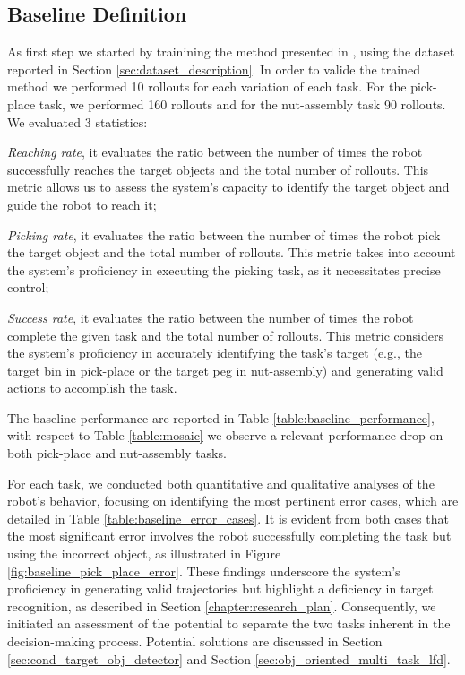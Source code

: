 \subsection{Baseline Definition}
\label{sec:baseline_definition}
As first step we started by trainining the method presented in \cite{mandi2022towards_more_generalizable_one_shot}, using the dataset reported in Section \ref{sec:dataset_description}. In order to valide the trained method we performed 10 rollouts for each variation of each task. For the pick-place task, we performed 160 rollouts and for the nut-assembly task 90 rollouts. We evaluated 3 statistics:
\begin{enumerate*}[label=(\arabic*)]
    \item \textit{Reaching rate}, it evaluates the ratio between the number of times the robot successfully reaches the target objects and the total number of rollouts. This metric allows us to assess the system's capacity to identify the target object and guide the robot to reach it;
    \item \textit{Picking rate}, it evaluates the ratio between the number of times the robot pick the target object and the total number of rollouts. This metric takes into account the system's proficiency in executing the picking task, as it necessitates precise control;
    \item \textit{Success rate}, it evaluates the ratio between the number of times the robot complete the given task and the total number of rollouts. This metric considers the system's proficiency in accurately identifying the task's target (e.g., the target bin in pick-place or the target peg in nut-assembly) and generating valid actions to accomplish the task.
\end{enumerate*}
\newline The baseline performance are reported in Table \ref{table:baseline_performance}, with respect to Table \ref{table:mosaic} we observe a relevant performance drop on both pick-place and nut-assembly tasks.

\newline For each task, we conducted both quantitative and qualitative analyses of the robot's behavior, focusing on identifying the most pertinent error cases, which are detailed in Table \ref{table:baseline_error_cases}. It is evident from both cases that the most significant error involves the robot successfully completing the task but using the incorrect object, as illustrated in Figure \ref{fig:baseline_pick_place_error}. These findings underscore the system's proficiency in generating valid trajectories but highlight a deficiency in target recognition, as described in Section \ref{chapter:research_plan}. Consequently, we initiated an assessment of the potential to separate the two tasks inherent in the decision-making process. Potential solutions are discussed in Section \ref{sec:cond_target_obj_detector} and Section \ref{sec:obj_oriented_multi_task_lfd}.


